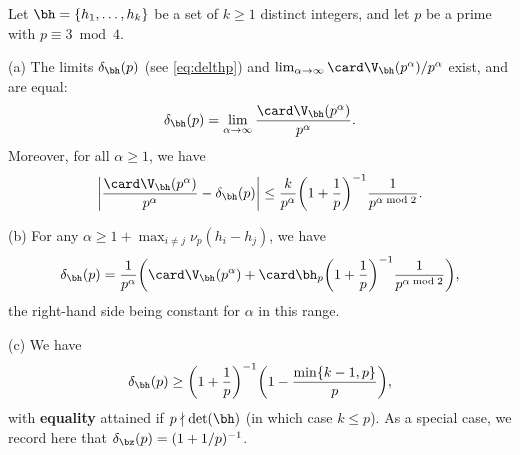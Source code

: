 \documentclass[12pt, reqno, twoside, letterpaper]{amsart}
\begin{document}
\begin{proposition}
 \label{prop:Sp3h}
Let $\bh = \{h_1,\ldots,h_k\}$ be a set of $k \ge 1$ distinct 
integers, and let $p$ be a prime with $p \equiv 3 \bmod 4$.
%

\textup{(}a\textup{)}
%
The limits $\delta_{\bh}(p)$ 
\textup{(}see \eqref{eq:delthp}\textup{)} and 
$\lim_{\alpha \to \infty} \card \V_{\bh}(p^{\alpha})/p^{\alpha}$ 
exist, and are equal:
\begin{equation}
 \label{eq:defdelthp3}
  \delta_{\bh}(p)
   = 
    \lim_{\alpha \to \infty}
     \frac{\card \V_{\bh}(p^{\alpha})}{p^{\alpha}}.
\end{equation}
%
Moreover, for all $\alpha \ge 1$, we have 
\begin{equation}
 \label{eq:Vhdeltp3bnd}
  \bigg|
   \frac{\card \V_{\bh}(p^{\alpha})}{p^{\alpha}}
     -
      \delta_{\bh}(p)
  \bigg|
   \le 
    \frac{k}{p^{\alpha }}
     \bigg(1 + \frac{1}{p}\bigg)^{-1} 
      \frac{1}{p^{\alpha \bmod 2}}.
\end{equation}

\textup{(}b\textup{)}
%
For any $\alpha \ge 1 + \max_{i \ne j} \nu_p(h_i - h_j)$, we have 
\begin{equation}
 \label{eq:delthp3}
  \delta_{\bh}(p)
   =
    \frac{1}{p^{\alpha}}
     \bigg(
      \card \V_{\bh}(p^{\alpha}) + \card \bh_p \bigg(1 + \frac{1}{p}\bigg)^{-1} \frac{1}{p^{\alpha \bmod 2}}
     \bigg),
\end{equation}
the right-hand side being constant for $\alpha$ in this range.

\textup{(}c\textup{)}
%
We have  
\begin{equation}
 \label{eq:delthpropsp3}
  \delta_{\bh}(p)
   \ge 
    \bigg(1 + \frac{1}{p}\bigg)^{-1}
     \bigg(1 - \frac{\min\{k - 1,p\}}{p}\bigg),
\end{equation}
with {\bfseries equality} attained if $p \nmid \det(\bh)$ 
\textup{(}in which case $k \le p$\textup{)}.
%
As a special case, we record here that 
$\delta_{\bz}(p) = (1 + 1/p)^{-1}$.
\end{proposition}
\end{document}
